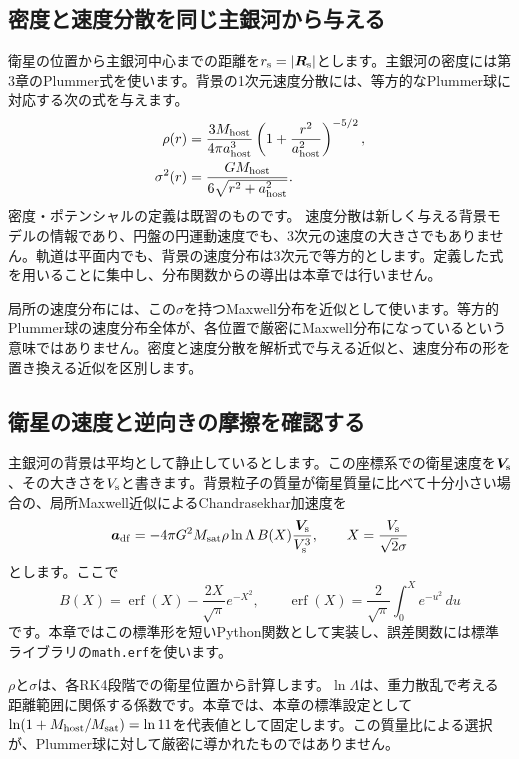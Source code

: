 \subsection{密度と速度分散を同じ主銀河から与える}
衛星の位置から主銀河中心までの距離を$r_{\rm s}=|\boldsymbol R_{\rm s}|$とします。主銀河の密度には第3章のPlummer式を使います。背景の1次元速度分散には、等方的なPlummer球に対応する次の式を与えます。
\begin{align}
 \rho(r)&=\frac{3M_{\rm host}}{4\pi a_{\rm host}^3}
 \left(1+\frac{r^2}{a_{\rm host}^2}\right)^{-5/2},\\
 \sigma^2(r)&=\frac{GM_{\rm host}}{6\sqrt{r^2+a_{\rm host}^2}}.
 \label{eq:ch7-background}
\end{align}
密度・ポテンシャルの定義は既習のものです。\cite{bt2008} 速度分散は新しく与える背景モデルの情報であり、円盤の円運動速度でも、3次元の速度の大きさでもありません。軌道は平面内でも、背景の速度分布は3次元で等方的とします。定義した式を用いることに集中し、分布関数からの導出は本章では行いません。

局所の速度分布には、この$\sigma$を持つMaxwell分布を近似として使います。等方的Plummer球の速度分布全体が、各位置で厳密にMaxwell分布になっているという意味ではありません。密度と速度分散を解析式で与える近似と、速度分布の形を置き換える近似を区別します。

\subsection{衛星の速度と逆向きの摩擦を確認する}
主銀河の背景は平均として静止しているとします。この座標系での衛星速度を$\boldsymbol V_{\rm s}$、その大きさを$V_{\rm s}$と書きます。背景粒子の質量が衛星質量に比べて十分小さい場合の、局所Maxwell近似によるChandrasekhar加速度を
\begin{equation}
 \boldsymbol a_{\rm df}=-4\pi G^2M_{\rm sat}\rho\ln\Lambda\,
 B(X)\frac{\boldsymbol V_{\rm s}}{V_{\rm s}^3},
 \qquad X=\frac{V_{\rm s}}{\sqrt{2}\sigma}
 \label{eq:ch7-drag}
\end{equation}
とします。ここで
\begin{equation}
 B(X)=\operatorname{erf}(X)-\frac{2X}{\sqrt{\pi}}e^{-X^2},
 \qquad \operatorname{erf}(X)=\frac{2}{\sqrt{\pi}}\int_0^X e^{-u^2}\,du
 \label{eq:ch7-maxwell}
\end{equation}
です。本章ではこの標準形を短いPython関数として実装し、誤差関数には標準ライブラリの\texttt{math.erf}を使います。\cite{bt2008}

$\rho$と$\sigma$は、各RK4段階での衛星位置から計算します。$\ln\Lambda$は、重力散乱で考える距離範囲に関係する係数です。本章では、本章の標準設定として$\ln(1+M_{\rm host}/M_{\rm sat})=\ln11$を代表値として固定します。この質量比による選択が、Plummer球に対して厳密に導かれたものではありません。

